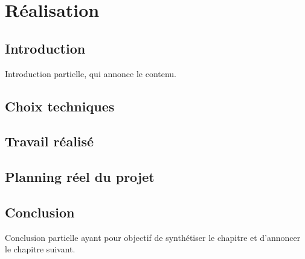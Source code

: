 \chapter{Réalisation}
	
\section*{Introduction}
    Introduction partielle, qui annonce  le contenu.

\section{Choix techniques}

\section{Travail réalisé}

\section{Planning réel du projet}

\section*{Conclusion}
    Conclusion partielle ayant pour objectif de synthétiser le chapitre et d’annoncer le chapitre suivant.